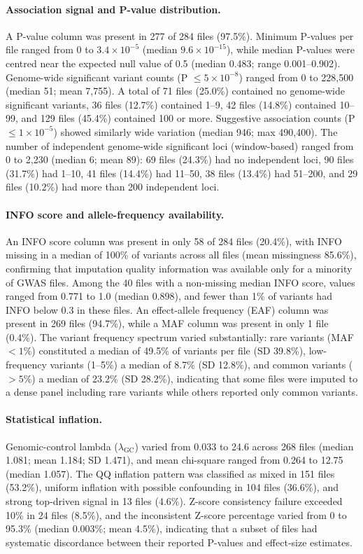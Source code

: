 \documentclass[11pt,a4paper]{article}
\begin{document}
\paragraph{Association signal and P-value distribution.}A P-value column was present in 277 of 284 files (97.5\%). Minimum P-values per file ranged from 0 to $3.4 \times 10^{-5}$ (median $9.6 \times 10^{-15}$), while median P-values were centred near the expected null value of 0.5 (median 0.483; range 0.001--0.902). Genome-wide significant variant counts (P $\leq 5 \times 10^{-8}$) ranged from 0 to 228,500 (median 51; mean 7,755). A total of 71 files (25.0\%) contained no genome-wide significant variants, 36 files (12.7\%) contained 1--9, 42 files (14.8\%) contained 10--99, and 129 files (45.4\%) contained 100 or more. Suggestive association counts (P $\leq 1 \times 10^{-5}$) showed similarly wide variation (median 946; max 490,400). The number of independent genome-wide significant loci (window-based) ranged from 0 to 2,230 (median 6; mean 89): 69 files (24.3\%) had no independent loci, 90 files (31.7\%) had 1--10, 41 files (14.4\%) had 11--50, 38 files (13.4\%) had 51--200, and 29 files (10.2\%) had more than 200 independent loci.

\paragraph{INFO score and allele-frequency availability.}An INFO score column was present in only 58 of 284 files (20.4\%), with INFO missing in a median of 100\% of variants across all files (mean missingness 85.6\%), confirming that imputation quality information was available only for a minority of GWAS files. Among the 40 files with a non-missing median INFO score, values ranged from 0.771 to 1.0 (median 0.898), and fewer than 1\% of variants had INFO below 0.3 in these files. An effect-allele frequency (EAF) column was present in 269 files (94.7\%), while a MAF column was present in only 1 file (0.4\%). The variant frequency spectrum varied substantially: rare variants (MAF $< 1\%$) constituted a median of 49.5\% of variants per file (SD 39.8\%), low-frequency variants (1--5\%) a median of 8.7\% (SD 12.8\%), and common variants ($> 5\%$) a median of 23.2\% (SD 28.2\%), indicating that some files were imputed to a dense panel including rare variants while others reported only common variants.

\paragraph{Statistical inflation.}Genomic-control lambda ($\lambda_{\text{GC}}$) varied from 0.033 to 24.6 across 268 files (median 1.081; mean 1.184; SD 1.471), and mean chi-square ranged from 0.264 to 12.75 (median 1.057). The QQ inflation pattern was classified as mixed in 151 files (53.2\%), uniform inflation with possible confounding in 104 files (36.6\%), and strong top-driven signal in 13 files (4.6\%). Z-score consistency failure exceeded 10\% in 24 files (8.5\%), and the inconsistent Z-score percentage varied from 0 to 95.3\% (median 0.003\%; mean 4.5\%), indicating that a subset of files had systematic discordance between their reported P-values and effect-size estimates.
\end{document}
